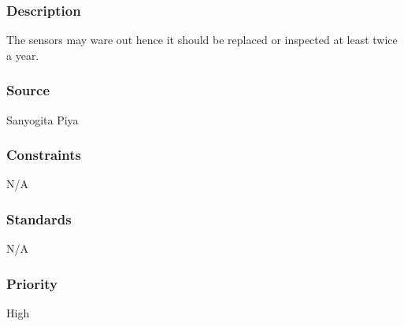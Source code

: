 \subsubsection{Description}
The sensors may ware out hence it should be replaced or inspected at least twice a year.
\subsubsection{Source}
Sanyogita Piya
\subsubsection{Constraints}
N/A
\subsubsection{Standards}
N/A
\subsubsection{Priority}
High
